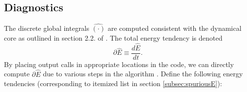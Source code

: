 \documentclass{agujournal}
\newcommand*{\gi}[1]{\widehat{#1}}
\begin{document}
\subsection{Diagnostics}
The discrete global integrals $\gi{(\cdot)}$ are computed consistent with the dynamical core as outlined in section 2.2. of \citet{LBDL2014JAMES}. The total energy tendency is denoted
\begin{equation}
\partial \gi{E}\equiv \frac{d\gi{E}}{dt}.
\end{equation}
{}
By placing output calls in appropriate locations in the code, we can directly compute $\partial \gi{E}$ due to various steps in the algorithm {\color{red}{refer section 2.2}}. Define the following energy tendencies (corresponding to itemized list in section \ref{subsec:spuriousE}):
\end{document}
